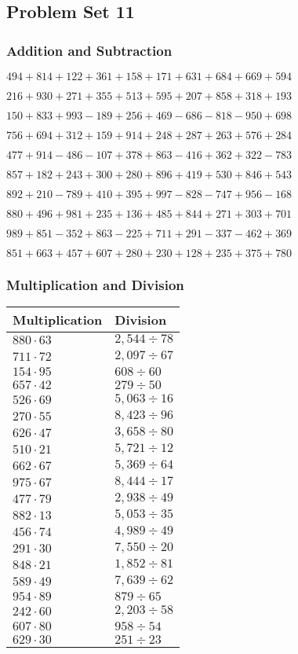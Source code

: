 \hypertarget{problem-set-11-2}{%
\subsection{Problem Set 11}\label{problem-set-11-2}}

\hypertarget{addition-and-subtraction-111}{%
\subsubsection{Addition and
Subtraction}\label{addition-and-subtraction-111}}

\(494 + 814 + 122 + 361 + 158 + 171 + 631 + 684 + 669 + 594\)

\(216 + 930 + 271 + 355 + 513 + 595 + 207 + 858 + 318 + 193\)

\(150 + 833 + 993 - 189 + 256 + 469 - 686 - 818 - 950 + 698\)

\(756 + 694 + 312 + 159 + 914 + 248 + 287 + 263 + 576 + 284\)

\(477 + 914 - 486 - 107 + 378 + 863 - 416 + 362 + 322 - 783\)

\(857 + 182 + 243 + 300 + 280 + 896 + 419 + 530 + 846 + 543\)

\(892 + 210 - 789 + 410 + 395 + 997 - 828 - 747 + 956 - 168\)

\(880 + 496 + 981 + 235 + 136 + 485 + 844 + 271 + 303 + 701\)

\(989 + 851 - 352 + 863 - 225 + 711 + 291 - 337 - 462 + 369\)

\(851 + 663 + 457 + 607 + 280 + 230 + 128 + 235 + 375 + 780\)

\hypertarget{multiplication-and-division-111}{%
\subsubsection{Multiplication and
Division}\label{multiplication-and-division-111}}

\begin{longtable}[]{@{}ll@{}}
\toprule
Multiplication & Division\tabularnewline
\midrule
\endhead
\(880 \cdot 63\) & \(2,544÷78\)\tabularnewline
\(711 \cdot 72\) & \(2,097÷67\)\tabularnewline
\(154 \cdot 95\) & \(608÷60\)\tabularnewline
\(657 \cdot 42\) & \(279÷50\)\tabularnewline
\(526 \cdot 69\) & \(5,063÷16\)\tabularnewline
\(270 \cdot 55\) & \(8,423÷96\)\tabularnewline
\(626 \cdot 47\) & \(3,658÷80\)\tabularnewline
\(510 \cdot 21\) & \(5,721÷12\)\tabularnewline
\(662 \cdot 67\) & \(5,369÷64\)\tabularnewline
\(975 \cdot 67\) & \(8,444÷17\)\tabularnewline
\(477 \cdot 79\) & \(2,938÷49\)\tabularnewline
\(882 \cdot 13\) & \(5,053÷35\)\tabularnewline
\(456 \cdot 74\) & \(4,989÷49\)\tabularnewline
\(291 \cdot 30\) & \(7,550÷20\)\tabularnewline
\(848 \cdot 21\) & \(1,852÷81\)\tabularnewline
\(589 \cdot 49\) & \(7,639÷62\)\tabularnewline
\(954 \cdot 89\) & \(879÷65\)\tabularnewline
\(242 \cdot 60\) & \(2,203÷58\)\tabularnewline
\(607 \cdot 80\) & \(958÷54\)\tabularnewline
\(629 \cdot 30\) & \(251÷23\)\tabularnewline
\bottomrule
\end{longtable}

